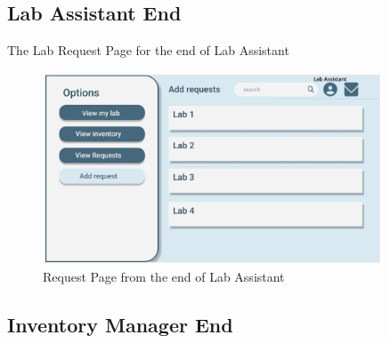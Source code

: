 \documentclass[20pt]{beamer}
\numberwithin{figure}{section}
\begin{document}
\subsection{Lab Assistant End}

\begin{frame}{The Lab Request Page for the end of Lab Assistant}

     \begin{figure}
        \centering
        \includegraphics[width= 0.9\textwidth , height= 0.5\paperheight]{LabAssistantAddRequestUI.png}
        \caption{Request Page from the end of Lab Assistant}
        \label{fig:60}
    \end{figure}

\end{frame}

\subsection{Inventory Manager End}
\end{document}
